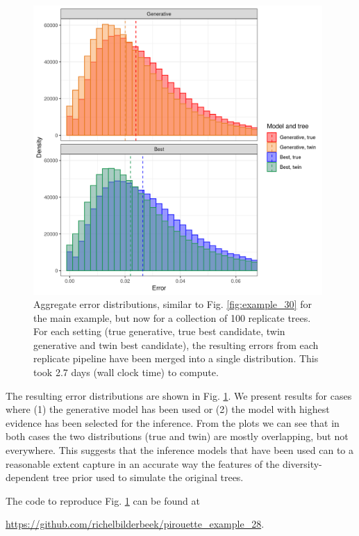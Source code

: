 \begin{figure}[H]
  \includegraphics[width=0.98\textwidth]{pirouette_example_28/errors.png}
  \caption{
    Aggregate error distributions, 
    similar to Fig. \ref{fig:example_30} for the main example, 
    but now for a collection of 100 replicate trees. 
    For each setting (true generative, true best candidate, 
    twin generative and twin best candidate), the resulting errors 
    from each replicate pipeline have been merged into a single distribution. 
    This took 2.7 days (wall clock time) to compute.
  }
  \label{fig:replicate_trees}
\end{figure}

The resulting error distributions are shown in Fig. \ref{fig:replicate_trees}. 
We present results for cases where (1) the generative model has been used 
or (2) the model with highest evidence has been selected for the inference.
From the plots we can see that in both cases the two distributions 
(true and twin) are mostly overlapping, but not everywhere.
This suggests that the inference 
models that have been used can to a reasonable extent capture in an accurate way 
the features of the diversity-dependent tree prior used to simulate 
the original trees. 

The code to reproduce Fig. \ref{fig:replicate_trees} can be found at  
\begin{sloppypar}
  \url{https://github.com/richelbilderbeek/pirouette_example_28}.
\end{sloppypar}

